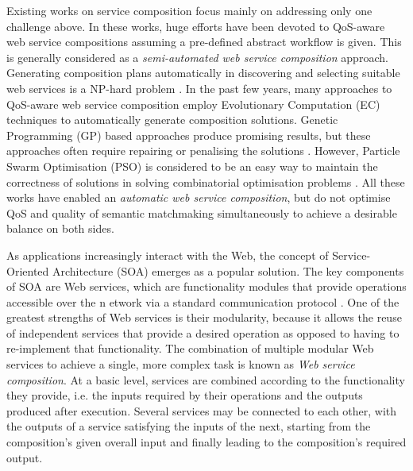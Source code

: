 Existing works on service composition focus mainly on addressing only one challenge above. In these works, huge efforts have been devoted to QoS-aware web service compositions assuming a pre-defined abstract workflow is given. This is generally considered as a \textit{semi-automated web service composition} approach. Generating composition plans automatically in discovering and selecting suitable web services is a NP-hard problem \cite{moghaddam2014service}. In the past few years, many approaches \cite{gupta2015optimization,ma2015hybrid,qi2010combining,da2016particle,da2015graphevol,yu2013adaptive} to QoS-aware web service composition employ Evolutionary Computation (EC) techniques to automatically generate composition solutions. Genetic Programming (GP) based approaches produce promising results, but these approaches often require repairing or penalising the solutions \cite{ma2015hybrid,yu2013adaptive}. However, Particle Swarm Optimisation (PSO) is considered to be an easy way to maintain the correctness of solutions in solving combinatorial optimisation problems \cite{da2016particle}. All these works have enabled an \textit{automatic web service composition}, but do not optimise QoS and quality of semantic matchmaking simultaneously to achieve a desirable balance on both sides.




As applications increasingly interact with the Web, the concept of Service-Oriented Architecture (SOA) \cite{perrey2003service}
emerges as a popular solution. The key components of SOA are Web services, which are functionality modules that
provide operations accessible over the n etwork via a standard communication protocol \cite{gottschalk2002introduction}. One of the greatest strengths of Web services is their modularity, because it allows the reuse of independent services that provide a
desired operation as opposed to having to re-implement that functionality. The combination of multiple modular Web services
to achieve a single, more complex task is known as \textit{Web service composition}. At a basic level, services are combined according to the functionality they provide, i.e. the inputs required by their operations and the outputs produced after execution. Several services may be connected to each other, with the outputs of a service satisfying the inputs of the next, starting from the composition's given overall input and finally leading to the composition's required output.

